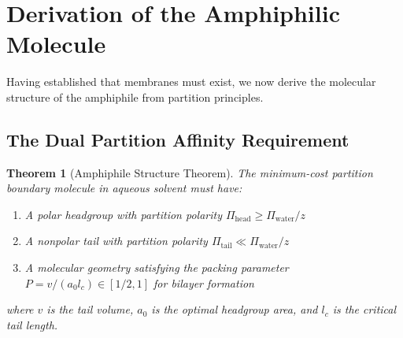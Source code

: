 \documentclass[twocolumn,10pt]{article}
\newtheorem{theorem}{Theorem}[section]
\theoremstyle{remark}
\begin{document}
\section{Derivation of the Amphiphilic Molecule}
\label{sec:amphiphile}

Having established that membranes must exist, we now derive the molecular structure of the amphiphile from partition principles.

\subsection{The Dual Partition Affinity Requirement}

\begin{theorem}[Amphiphile Structure Theorem]
\label{thm:amphiphile_structure}
The minimum-cost partition boundary molecule in aqueous solvent must have:
\begin{enumerate}
    \item A polar headgroup with partition polarity $\Pi_{\text{head}} \geq \Pi_{\text{water}}/z$
    \item A nonpolar tail with partition polarity $\Pi_{\text{tail}} \ll \Pi_{\text{water}}/z$
    \item A molecular geometry satisfying the packing parameter $P = v/(a_0 l_c) \in [1/2, 1]$ for bilayer formation
\end{enumerate}
where $v$ is the tail volume, $a_0$ is the optimal headgroup area, and $l_c$ is the critical tail length.
\end{theorem}
\end{document}
